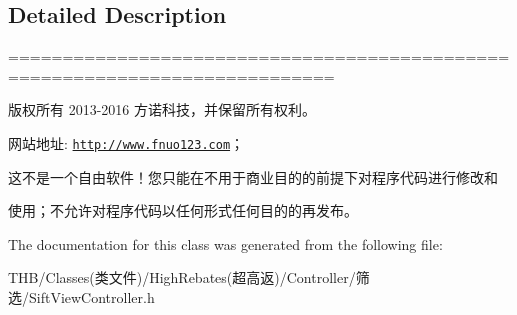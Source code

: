 \subsection{Detailed Description}
============================================================================

版权所有 2013-\/2016 方诺科技，并保留所有权利。

网站地址\+: \href{http://www.fnuo123.com}{\tt http\+://www.\+fnuo123.\+com}； 



这不是一个自由软件！您只能在不用于商业目的的前提下对程序代码进行修改和

使用；不允许对程序代码以任何形式任何目的的再发布。 

 

The documentation for this class was generated from the following file\+:\begin{DoxyCompactItemize}
\item 
T\+H\+B/\+Classes(类文件)/\+High\+Rebates(超高返)/\+Controller/筛选/Sift\+View\+Controller.\+h\end{DoxyCompactItemize}
